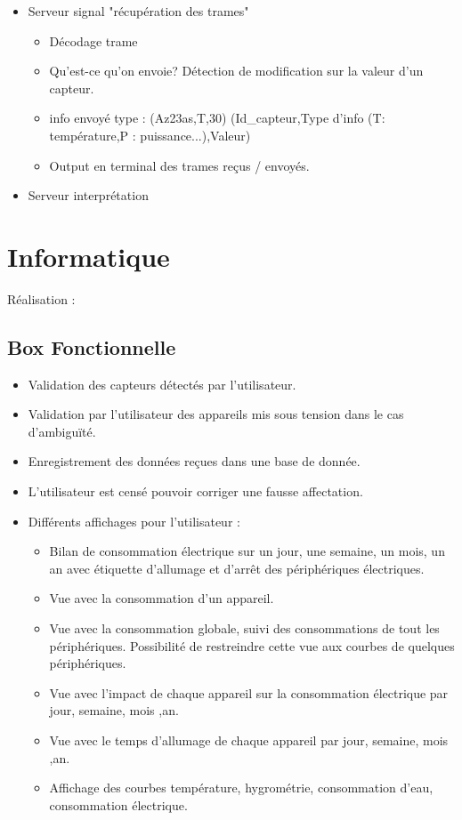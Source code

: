 \documentclass[10pt,a4paper]{article}
\begin{document}
\begin{itemize}
\item Serveur signal "récupération des trames"
\begin{itemize}
\item Décodage trame
\item Qu'est-ce qu'on envoie? Détection de modification sur la valeur d'un capteur.
\item info envoyé type : (Az23as,T,30) (Id\_capteur,Type d'info (T: température,P : puissance...),Valeur)
\item Output en terminal des trames reçus / envoyés.
\end{itemize}
\end{itemize}

\begin{itemize}
\item Serveur interprétation
\end{itemize}

\section{Informatique}
Réalisation :
\subsection{Box Fonctionnelle}
\begin{itemize}
  \item Validation des capteurs détectés par l'utilisateur.
  \item Validation par l'utilisateur des appareils mis sous tension dans le cas d'ambiguïté.
  \item Enregistrement des données reçues dans une base de donnée.
  \item L'utilisateur est censé pouvoir corriger une fausse affectation.
  \item Différents affichages pour l'utilisateur :
  \begin{itemize}
    \item Bilan de consommation électrique sur un jour, une semaine, un mois, un an avec étiquette d'allumage et d'arrêt des périphériques électriques.
    \item Vue avec la consommation d'un appareil.
    \item Vue avec la consommation globale, suivi des consommations de tout les périphériques. Possibilité de restreindre cette vue aux courbes de quelques périphériques.
    \item Vue avec l'impact de chaque appareil sur la consommation électrique par jour, semaine, mois ,an.
    \item Vue avec le temps d'allumage de chaque appareil par jour, semaine, mois ,an.
    \item Affichage des courbes température, hygrométrie, consommation d'eau, consommation électrique.
  \end{itemize}
\end{itemize}
\end{document}
